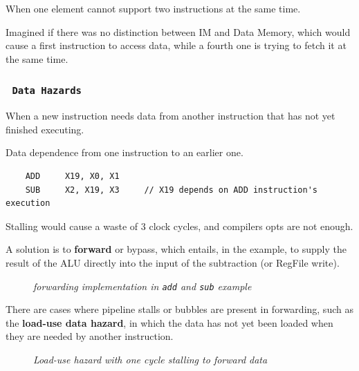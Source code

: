 \documentclass[11pt]{article}
\begin{document}
When one element cannot support two instructions at the same time.

Imagined if there was no distinction between IM and Data Memory, which would cause a first instruction to access data, while a fourth one is trying to fetch it at the same time.

\subsubsection*{\rightarrow \ \texttt{Data Hazards}}
\vspace{-0.5em}

When a new instruction needs data from another instruction that has not yet finished executing.

Data dependence from one instruction to an earlier one.

\begin{verbatim}
    ADD     X19, X0, X1
    SUB     X2, X19, X3     // X19 depends on ADD instruction's execution
\end{verbatim}

Stalling would cause a waste of 3 clock cycles, and compilers opts are not enough.

A solution is to \textbf{forward} or bypass, which entails, in the example, to supply the result of the ALU directly into the input of the subtraction (or RegFile write).

\begin{figure}[htbp]
    \centering
    \caption{\textit{forwarding implementation in \texttt{add} and \texttt{sub} example}}
\end{figure}

There are cases where pipeline stalls or bubbles are present in forwarding, such as the \textbf{load-use data hazard}, in which the data has not yet been loaded when they are needed by another instruction.

\begin{figure}[htbp]
    \centering
    \caption{\textit{Load-use hazard with one cycle stalling to forward data}}
\end{figure}
\end{document}
